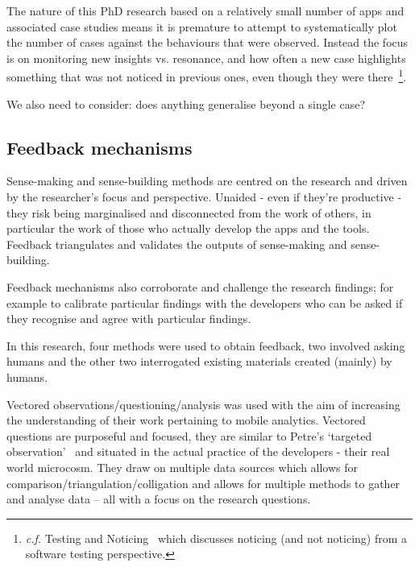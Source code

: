 The nature of this PhD research based on a relatively small number of apps and associated case studies means it is premature to attempt to systematically plot the number of cases against the behaviours that were observed. Instead the focus is on monitoring 
new insights vs. resonance, and how often a new case highlights something that was not noticed in previous ones, even though they were there~\footnote{\textit{c.f.} Testing and Noticing~\citep{bolton2009_testing_and_noticing} which discusses noticing (and not noticing) from a software testing perspective.}.

We also need to consider: does anything generalise beyond a single case?   


\subsection{Feedback mechanisms}
Sense-making and sense-building methods are centred on the research and driven by the researcher's focus and perspective. Unaided - even if they're productive - they risk being marginalised and disconnected from the work of others, in particular the work of those who actually develop the apps and the tools. Feedback triangulates and validates the outputs of sense-making and sense-building. 

Feedback mechanisms also corroborate and challenge the research findings; for example to calibrate particular findings with the developers who can be asked if they recognise and agree with particular findings.

In this research, four methods were used to obtain feedback, two involved asking humans and the other two interrogated existing materials created (mainly) by humans.

\label{method-vectored-questions}
Vectored observations/questioning/analysis was used with the aim of increasing the understanding of their work pertaining to mobile analytics. Vectored questions are purposeful and focused, they are similar to Petre's `targeted observation'~\citep[p.234]{petre2009_insights_from_expert_software_design_practice} and situated in the actual practice of the developers - their real world microcosm. They draw on multiple data sources which allows for comparison/triangulation/colligation and allows for multiple methods to gather and analyse data -- all with a focus on the research questions.


